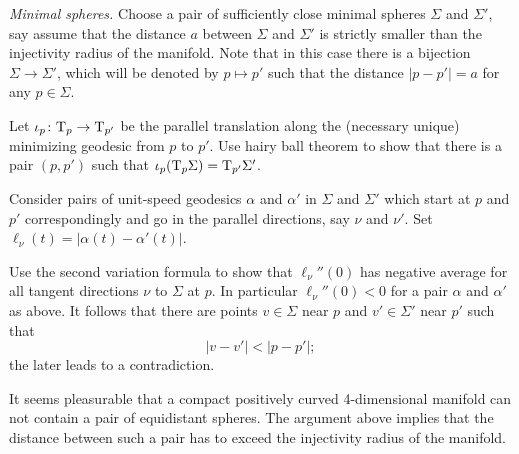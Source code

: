                                                       



\textit{Minimal spheres.}
Choose a pair of sufficiently close minimal spheres $\Sigma$ and $\Sigma'$,
say assume that the distance $a$ between $\Sigma$ and $\Sigma'$ is strictly smaller than the injectivity radius of the manifold.
Note that in this case there is a bijection $\Sigma\to \Sigma'$, which will be denoted by $p\mapsto p'$ such that the distance $|p-p'|=a$ for any $p\in\Sigma$.

Let $\iota_p\colon\mathrm{T}_p\to\mathrm{T}_{p'}$ be the parallel translation along the (necessary unique) minimizing geodesic from $p$ to $p'$.
Use hairy ball theorem 
to show that there is a pair $(p,p')$ such that $\iota_p(\mathrm{T}_p\Sigma)=\mathrm{T}_{p'}\Sigma'$.

Consider pairs of unit-speed geodesics $\alpha$ and $\alpha'$ 
in $\Sigma$ and $\Sigma'$  
which start at $p$ and $p'$ correspondingly
and go in the parallel directions, say $\nu$ and $\nu'$. 
Set $\ell_\nu(t)=|\alpha(t)-\alpha'(t)|$.

Use the second variation formula to show that $\ell_\nu''(0)$ has negative average for all tangent directions $\nu$ to $\Sigma$ at $p$. 
In particular $\ell_\nu''(0)<0$ for a pair $\alpha$ and $\alpha'$ as above.
It follows that there are points $v\in\Sigma$ near $p$ 
and $v'\in\Sigma'$ near $p'$
such that 
\[|v-v'|<|p-p'|;\]
the later leads to a contradiction.

It seems pleasurable that a 
compact 
positively curved 
4-dimensional manifold
can not contain a pair of equidistant spheres.
The argument above implies that the distance between such a pair has to exceed the injectivity radius of the manifold.

